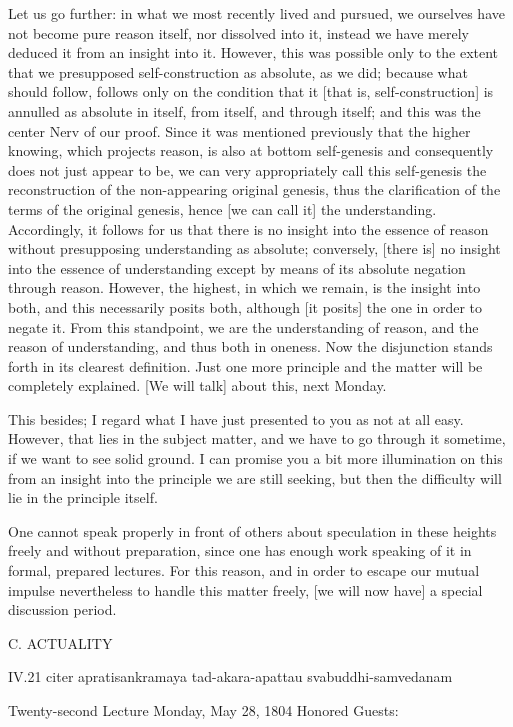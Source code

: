 Let us go further:
in what we most recently lived and pursued,
we ourselves have not become pure reason itself,
nor dissolved into it, instead we have merely
deduced it from an insight into it.
However, this was possible only to the extent
that we presupposed self-construction as absolute, as we did;
because what should follow, follows only
on the condition that it [that is, self-construction] is
annulled as absolute in itself, from itself, and through itself;
and this was the center {Nerv} of our proof.
Since it was mentioned previously that the higher knowing,
which projects reason, is also at bottom self-genesis
and consequently does not just appear to be,
we can very appropriately call this self-genesis
the reconstruction of the non-appearing original genesis,
thus the clarification of the terms of the original genesis,
hence [we can call it] the understanding.
Accordingly, it follows for us that
there is no insight into the essence of reason
without presupposing understanding as absolute;
conversely, [there is] no insight into
the essence of understanding except by
means of its absolute negation through reason.
However, the highest, in which we remain,
is the insight into both,
and this necessarily posits both,
although [it posits] the one in order to negate it.
From this standpoint, we are the understanding of reason,
and the reason of understanding, and thus both in oneness.
Now the disjunction stands forth in its clearest definition.
Just one more principle and the matter will be completely explained.
[We will talk] about this, next Monday.

This besides; I regard what I have just
presented to you as not at all easy.
However, that lies in the subject matter,
and we have to go through it sometime,
if we want to see solid ground.
I can promise you a bit more illumination on this
from an insight into the principle we are still seeking,
but then the difficulty will lie in the principle itself.

One cannot speak properly in front of others about
speculation in these heights freely and without preparation,
since one has enough work speaking of it in formal, prepared lectures.
For this reason, and in order to escape our mutual impulse
nevertheless to handle this matter freely,
[we will now have] a special discussion period.

C. ACTUALITY

IV.21
citer apratisankramaya tad-akara-apattau svabuddhi-samvedanam

Twenty-second Lecture
Monday, May 28, 1804
Honored Guests:

